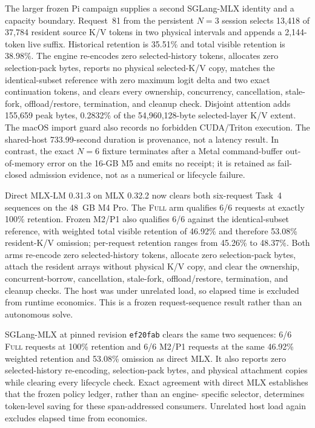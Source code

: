 \documentclass[11pt]{article}
\begin{document}
The larger frozen Pi campaign supplies a second SGLang-MLX identity and a
capacity boundary.  Request~81 from the persistent $N=3$ session selects
13,418 of 37,784 resident source K/V tokens in two physical intervals and
appends a 2,144-token live suffix.  Historical retention is 35.51\% and total
visible retention is 38.98\%.  The engine re-encodes zero selected-history
tokens, allocates zero selection-pack bytes, reports no physical selected-K/V
copy, matches the identical-subset reference with zero maximum logit delta and
two exact continuation tokens, and clears every ownership, concurrency,
cancellation, stale-fork, offload/restore, termination, and cleanup check.
Disjoint attention adds 155,659 peak bytes, 0.2832\% of the 54,960,128-byte
selected-layer K/V extent.  The macOS import guard also records no forbidden
CUDA/Triton execution.  The shared-host 733.99-second duration is provenance,
not a latency result.  In contrast, the exact $N=6$ fixture terminates after a
Metal command-buffer out-of-memory error on the 16-GB M5 and emits no receipt;
it is retained as fail-closed admission evidence, not as a numerical or
lifecycle failure.

Direct MLX-LM 0.31.3 on MLX 0.32.2 now clears both six-request Task~4
sequences on the 48~GB M4 Pro.  The \textsc{Full} arm qualifies 6/6 requests
at exactly 100\% retention.  Frozen M2/P1 also qualifies 6/6 against the
identical-subset reference, with weighted total visible retention of 46.92\%
and therefore 53.08\% resident-K/V omission; per-request retention ranges from
45.26\% to 48.37\%.  Both arms re-encode zero selected-history tokens, allocate
zero selection-pack bytes, attach the resident arrays without physical K/V
copy, and clear the ownership, concurrent-borrow, cancellation, stale-fork,
offload/restore, termination, and cleanup checks.  The host was under unrelated
load, so elapsed time is excluded from runtime economics.  This is a frozen
request-sequence result rather than an autonomous solve.

SGLang-MLX at pinned revision \texttt{ef20fab} clears the same two sequences:
6/6 \textsc{Full} requests at 100\% retention and 6/6 M2/P1 requests at the
same 46.92\% weighted retention and 53.08\% omission as direct MLX.  It also
reports zero selected-history re-encoding, selection-pack bytes, and physical
attachment copies while clearing every lifecycle check.  Exact agreement with
direct MLX establishes that the frozen policy ledger, rather than an engine-
specific selector, determines token-level saving for these span-addressed
consumers.  Unrelated host load again excludes elapsed time from economics.
\end{document}
